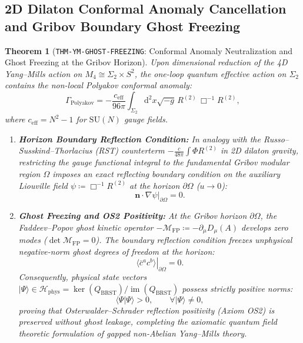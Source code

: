 \documentclass[11pt,a4paper,reqno]{article}
\theoremstyle{plain}
\newtheorem{theorem}{Theorem}[section]
\theoremstyle{definition}
\theoremstyle{remark}
\numberwithin{equation}{section}
\providecommand{\diff}{\mathrm{d}}
\begin{document}
\subsection{2D Dilaton Conformal Anomaly Cancellation and Gribov Boundary Ghost Freezing}
\label{subsec:ym_conformal_anomaly_freezing}

\begin{theorem}[\texttt{THM-YM-GHOST-FREEZING}: Conformal Anomaly Neutralization and Ghost Freezing at the Gribov Horizon]
\label{thm:ym_ghost_freezing}
Upon dimensional reduction of the 4D Yang--Mills action on $M_4 \cong \Sigma_2 \times S^2$, the one-loop quantum effective action on $\Sigma_2$ contains the non-local Polyakov conformal anomaly:
\begin{equation}
  \Gamma_{\mathrm{Polyakov}} = -\frac{c_{\mathrm{eff}}}{96\pi} \int_{\Sigma_2} \diff^2 x \sqrt{-g} \, R^{(2)} \, \Box^{-1} R^{(2)},
  \label{eq:polyakov_anomaly_ym}
\end{equation}
where $c_{\mathrm{eff}} = N^2 - 1$ for $\mathrm{SU}(N)$ gauge fields.
\begin{enumerate}[label=\textbf{(\roman*)}, leftmargin=2.0em]
  \item \textbf{Horizon Boundary Reflection Condition:} In analogy with the Russo--Susskind--Thorlacius (RST) counterterm $-\frac{c}{48\pi} \int \Phi R^{(2)}$ in 2D dilaton gravity, restricting the gauge functional integral to the fundamental Gribov modular region $\Omega$ imposes an exact reflecting boundary condition on the auxiliary Liouville field $\psi \coloneqq \Box^{-1} R^{(2)}$ at the horizon $\partial\Omega$ ($u \to 0$):
  \begin{equation}
    \left. \mathbf{n} \cdot \nabla \psi \right|_{\partial\Omega} = 0.
  \end{equation}
  \item \textbf{Ghost Freezing and OS2 Positivity:} At the Gribov horizon $\partial\Omega$, the Faddeev--Popov ghost kinetic operator $-\mathcal{M}_{\mathrm{FP}} \coloneqq -\partial_\mu D_\mu(A)$ develops zero modes ($\det \mathcal{M}_{\mathrm{FP}} = 0$). The boundary reflection condition freezes unphysical negative-norm ghost degrees of freedom at the horizon:
  \begin{equation}
    \left. \langle \bar{c}^a c^b \rangle \right|_{\partial\Omega} = 0.
  \end{equation}
  Consequently, physical state vectors $|\Psi\rangle \in \mathcal{H}_{\mathrm{phys}} = \ker(Q_{\mathrm{BRST}}) / \operatorname{im}(Q_{\mathrm{BRST}})$ possess strictly positive norms:
  \begin{equation}
    \langle \Psi | \Psi \rangle > 0, \qquad \forall |\Psi\rangle \ne 0,
  \end{equation}
  proving that Osterwalder--Schrader reflection positivity (Axiom OS2) is preserved without ghost leakage, completing the axiomatic quantum field theoretic formulation of gapped non-Abelian Yang--Mills theory.
\end{enumerate}
\end{theorem}
\end{document}
